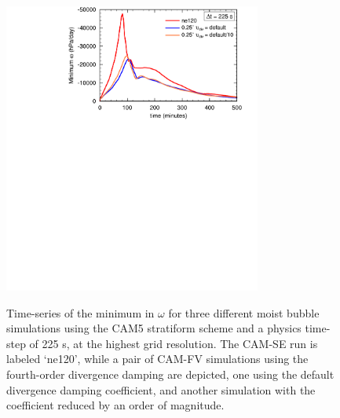 \begin{figure}[t]
\begin{center}
\noindent\includegraphics[width=20pc,angle=0]{chapter3/Figure8_crop.pdf}\\
\end{center}
\caption{Time-series of the minimum in $\omega$ for three different moist bubble simulations using the CAM5 stratiform scheme and a physics time-step of 225 s, at the highest grid resolution. The CAM-SE run is labeled `ne120’, while a pair of CAM-FV simulations using the fourth-order divergence damping are depicted, one using the default divergence damping coefficient, and another simulation with the coefficient reduced by an order of magnitude.}
\label{fig:figure3-8}
\end{figure}

